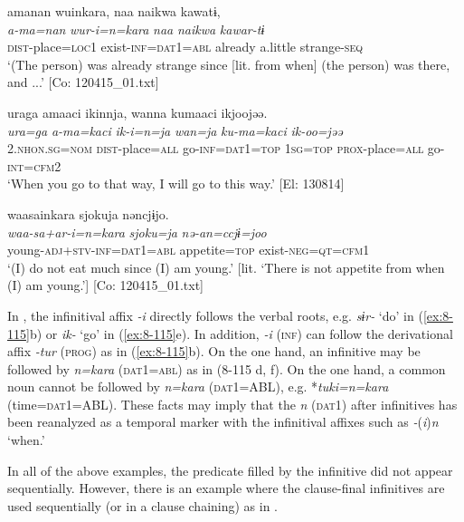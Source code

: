 {\TM}
\glll  amanan  wuinkara,  naa  naikwa  kawatɨ,\\
\textit{a-ma=nan}  \textit{wur-i=n=kara}  \textit{naa}  \textit{naikwa}  \textit{kawar-tɨ}\\
\textsc{dist}-place=\textsc{loc1}  exist-\textsc{inf}=\textsc{dat1}=\textsc{abl}  already  a.little  strange-\textsc{seq}\\
\glt ‘(The person) was already strange since [lit. from when] (the person) was there, and ...’ [Co: 120415\_01.txt]

\ex
{\TM}
\glll  uraga  amaaci  ikinnja,      wanna  kumaaci  ikjoojəə.\\
\textit{ura=ga}  \textit{a-ma=kaci}  \textit{ik-i=n=ja}   \textit{wan=ja}  \textit{ku-ma=kaci}  \textit{ik-oo=jəə}\\
2.\textsc{nhon}.\textsc{sg}=\textsc{nom}  \textsc{dist}-place=\textsc{all}  go-\textsc{inf}=\textsc{dat1}=\textsc{top}  1\textsc{sg}=\textsc{top}  \textsc{prox}-place=\textsc{all}  go-\textsc{int}=\textsc{cfm2}\\
\glt ‘When you go to that way, I will go to this way.’ [El: 130814]

\ex
{\TM}
\glll  waasainkara  {\textbar}sjoku{\textbar}ja  nəncjɨjo.\\
\textit{waa-sa+ar-i=n=kara}  \textit{sjoku=ja}  \textit{nə-an=ccjɨ=joo}\\
young-\textsc{adj}+\textsc{stv}-\textsc{inf}=\textsc{dat1}=\textsc{abl}  appetite=\textsc{top}  exist-\textsc{neg}=\textsc{qt}=\textsc{cfm1}\\
\glt ‘(I) do not eat much since (I) am young.’ [lit. ‘There is not appetite from when (I) am young.’]      [Co: 120415\_01.txt]
\z
\z


In , the infinitival affix \textit{-i} directly follows the verbal roots, e.g. \textit{sɨr-} ‘do’ in (\ref{ex:8-115}b) or \textit{ik-} ‘go’ in (\ref{ex:8-115}e). In addition, \textit{-i} (\textsc{inf}) can follow the derivational affix \textit{-tur} (\textsc{prog}) as in (\ref{ex:8-115}b). On the one hand, an infinitive may be followed by \textit{n=kara} (\textsc{dat1}=\textsc{abl}) as in (8-115 d, f). On the one hand, a common noun cannot be followed by \textit{n=kara} (\textsc{dat1}=ABL), e.g. *\textit{tuki=n=kara} (time=\textsc{dat1}=ABL). These facts may imply that the \textit{n} (\textsc{dat1}) after infinitives has been reanalyzed as a temporal marker with the infinitival affixes such as \textit{-}(\textit{i})\textit{n} ‘when.’

In all of the above examples, the predicate filled by the infinitive did not appear sequentially. However, there is an example where the clause-final infinitives are used sequentially (or in a clause chaining) as in .

